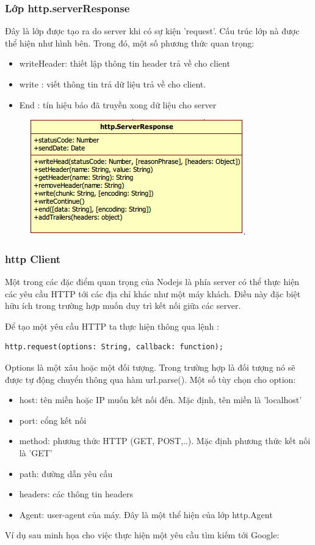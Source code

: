 	\subsubsection{Lớp http.serverResponse}
		Đây là lớp được tạo ra do server khi có sự kiện 'request'. Cấu trúc lớp nà được thể hiện như hình bên. Trong đó, một số phương thức quan trọng:
		\begin{itemize}
			\item writeHeader: thiết lập thông tin header trả về cho client
			\item write : viết thông tin trả dữ liệu trả về cho client.
			\item End : tín hiệu báo  đã truyền xong dữ liệu cho server
		\end{itemize}
		
		\begin{figure}[h]
			\centering
			\includegraphics[scale=0.7]{3_3_5}
		\end{figure}
		
		
	\subsubsection{http Client}		
			
		Một trong các đặc điểm quan trọng của Nodejs là phía server có thể thực hiện các yêu cầu HTTP tới các địa chỉ khác như một máy khách. Điều này đặc biệt hữu ích trong trường hợp muốn duy trì kết nối giữa các server.
		
		Để tạo một yêu cầu HTTP ta thực hiện thông qua lệnh : 
		
		\begin{verbatim}
http.request(options: String, callback: function);
		\end{verbatim}
		
	Options là một xâu hoặc một đối tượng. Trong trường hợp là đối tượng nó sẽ được tự động chuyển thông qua hàm url.parse(). Một số tùy chọn cho option:
	\begin{itemize}
		\item host: tên miền hoặc IP muốn kết nối đến. Mặc định, tên miền là 'localhost'
		\item port: cổng kết nối
		\item method: phương thức HTTP (GET, POST,..). Mặc định phương thức kết nối là 'GET'
		\item path: đường dẫn yêu cầu
		\item headers: các thông tin headers
		\item Agent:  user-agent của máy. Đây là một thể hiện của lớp http.Agent
	\end{itemize}
	Ví dụ sau minh họa cho việc thực hiện một yêu cầu tìm kiếm tới Google:
	
